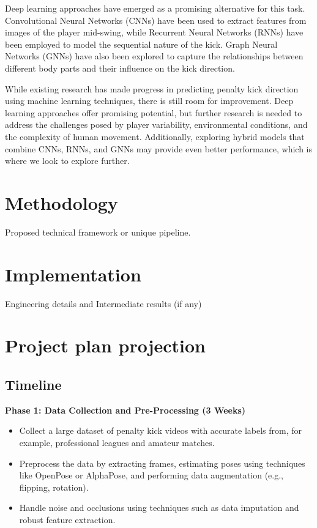 \documentclass{article}
\begin{document}
Deep learning approaches have emerged as a promising alternative for this task. Convolutional Neural Networks (CNNs) have been used to extract features from images of the player mid-swing, while Recurrent Neural Networks (RNNs) have been employed to model the sequential nature of the kick. Graph Neural Networks (GNNs) have also been explored to capture the relationships between different body parts and their influence on the kick direction.


While existing research has made progress in predicting penalty kick direction using machine learning techniques, there is still room for improvement. Deep learning approaches offer promising potential, but further research is needed to address the challenges posed by player variability, environmental conditions, and the complexity of human movement. Additionally, exploring hybrid models that combine CNNs, RNNs, and GNNs may provide even better performance, which is where we look to explore further.


\section{Methodology}
Proposed technical framework or unique pipeline.


\section{Implementation}
Engineering details and Intermediate results (if any)


\section{Project plan projection}
\subsection{Timeline}
{\bf{Phase 1: Data Collection and Pre-Processing (3 Weeks)}}
\begin{itemize}
    \item Collect a large dataset of penalty kick videos with accurate labels from, for example, professional leagues and amateur matches.
    \item Preprocess the data by extracting frames, estimating poses using techniques like OpenPose or AlphaPose, and performing data augmentation (e.g., flipping, rotation).
    \item Handle noise and occlusions using techniques such as data imputation and robust feature extraction.
\end{itemize}
\end{document}
